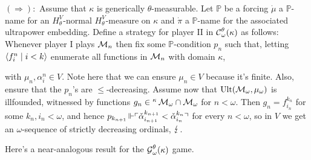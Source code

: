 {  \qquad $(\Rightarrow):$ Assume that $\kappa$ is generically $\theta$-measurable. Let $\mathbb P$ be a forcing $\dot\mu$ a $\mathbb P$-name for an $H_\theta^V$-normal $H_\theta^V$-measure on $\kappa$ and $\dot\pi$ a $\mathbb P$-name for the associated ultrapower embedding. Define a strategy for player II in $\operatorname{\mathcal C}_\omega^\theta(\kappa)$ as follows: Whenever player I plays $\operatorname{\mathcal M}_n$ then fix some $\mathbb P$-condition $p_n$ such that, letting $\langle f_i^n\mid i<k\rangle$ enumerate all functions in $\operatorname{\mathcal M}_n$ with domain $\kappa$,

  with $\mu_n,\alpha_i^n\in V$. Note here that we can ensure $\mu_n\in V$ because it's finite. Also, ensure that the $p_n$'s are $\leq$-decreasing. Assume now that $\operatorname{Ult}(\operatorname{\mathcal M}_\omega,\mu_\omega)$ is illfounded, witnessed by functions $g_n\in{^\kappa\operatorname{\mathcal M}_\omega}\cap\operatorname{\mathcal M}_\omega$ for $n<\omega$. Then $g_n=f_{i_n}^{k_n}$ for some $k_n,i_n<\omega$, and hence $p_{k_{n+1}}\operatorname{\Vdash}\ulcorner \check\alpha_{i_{n+1}}^{k_{n+1}}<\check\alpha_{i_n}^{k_n} \urcorner$ for every $n<\omega$, so in $V$ we get an $\omega$-sequence of strictly decreasing ordinals, $\operatorname{\lightning}$.
}

Here's a near-analogous result for the $\operatorname{\mathcal G}^\theta_\omega(\kappa)$ game.

